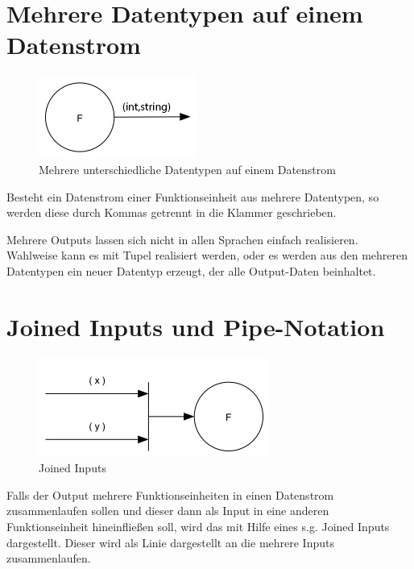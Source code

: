 \section{Mehrere Datentypen auf einem Datenstrom}


\begin{figure}[H]
	\centering
	\includegraphics[width=.5\linewidth]{./img/diagramIntString.png}
	\caption{Mehrere unterschiedliche Datentypen auf einem Datenstrom}
\end{figure}


Besteht ein Datenstrom einer Funktionseinheit aus mehrere Datentypen, so werden diese durch Kommas getrennt in die Klammer geschrieben.

Mehrere Outputs lassen sich nicht in allen Sprachen einfach realisieren.
Wahlweise kann es mit Tupel realisiert werden, oder es werden aus den mehreren Datentypen ein 
neuer Datentyp erzeugt, der alle Output-Daten beinhaltet.

\section{Joined Inputs und Pipe-Notation}

\begin{figure}[H]
	\centering
	\includegraphics[width=.7\linewidth]{./img/diagramJoin.png}
	\caption{Joined Inputs}
\end{figure}


Falls der Output mehrere Funktionseinheiten in einen Datenstrom zusammenlaufen
sollen und dieser dann als Input in eine anderen Funktionseinheit hineinfließen
soll, wird das mit Hilfe eines s.g. Joined Inputs dargestellt. 
Dieser wird als Linie dargestellt an die mehrere Inputs zusammenlaufen.

